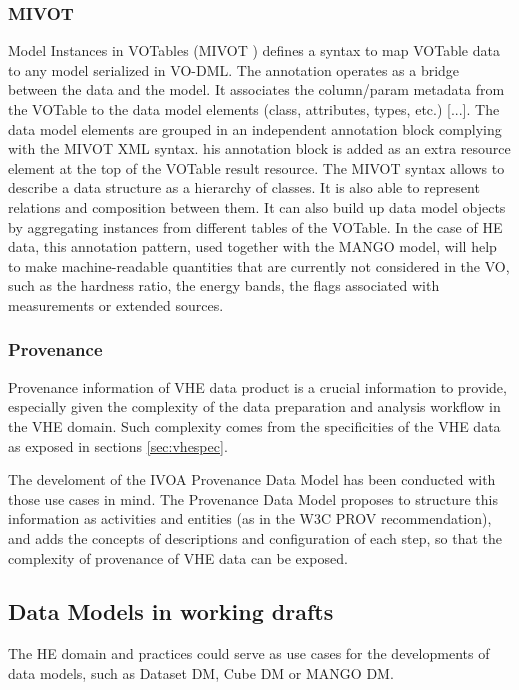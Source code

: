 \documentclass[11pt,a4paper]{ivoa}
\begin{document}
\subsubsection{MIVOT}

Model Instances in VOTables (MIVOT \cite{2023ivoa.spec.0620M}) defines a syntax to map VOTable data to any model serialized in VO-DML.
The annotation operates as a bridge between the data and the model.
It associates the column/param metadata from the VOTable to the data model elements (class, attributes, types, etc.) [...].
The data model elements are grouped in an independent annotation block complying with the MIVOT XML syntax. 
his annotation block is added as an extra resource element at the top of the VOTable result resource.
The MIVOT syntax allows to describe a data structure as a hierarchy of classes.
It is also able to represent relations and composition between them. It can also build up data model objects by aggregating instances from different tables of the VOTable.
In the case of HE data, this annotation pattern, used together with the MANGO model, will help to make machine-readable quantities that are currently not considered in the VO,
such as the hardness ratio, the energy bands, the flags associated with measurements or  extended sources.


\subsubsection{Provenance}

Provenance information of VHE data product is a crucial information to provide, especially given the complexity of the data preparation and analysis workflow in the VHE domain. Such complexity comes from the specificities of the VHE data as exposed in sections \ref{sec:vhespec}.

The develoment of the IVOA Provenance Data Model \citep{2020ivoa.spec.0411S} has been conducted with those use cases in mind. The Provenance Data Model proposes to structure this information as activities and entities (as in the W3C PROV recommendation), and adds the concepts of descriptions and configuration of each step, so that the complexity of provenance of VHE data can be exposed.


\subsection{Data Models in working drafts}

The HE domain and practices could serve as use cases for the developments of data models, such as Dataset DM, Cube DM or MANGO DM.
\end{document}
